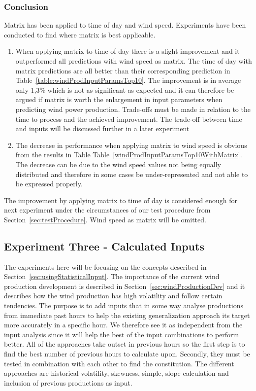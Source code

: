 \subsubsection{Conclusion}
Matrix has been applied to time of day and wind speed. Experiments have been conducted to find where matrix is best applicable.

\begin{enumerate}
\item When applying matrix to time of day there is a slight improvement and it outperformed all predictions with wind speed as matrix. The time of day with matrix predictions are all better than their corresponding prediction in Table~\ref{table:windProdInputParamsTop10}. The improvement is in average only 1,3\% which is not as significant as expected and it can therefore be argued if matrix is worth the enlargement in input parameters when predicting wind power production. Trade-offs must be made in relation to the time to process and the achieved improvement. The trade-off between time and inputs will be discussed further in a later experiment 
\item The decrease in performance when applying matrix to wind speed is obvious from the results in Table Table~\ref{windProdInputParamsTop10WithMatrix}. The decrease can be due to the wind speed values not being equally distributed and therefore in some cases be under-represented and not able to be expressed properly.  
\end{enumerate}

The improvement by applying matrix to time of day is considered enough for next experiment under the circumstances of our test procedure from Section~\ref{sec:testProcedure}. Wind speed as matrix will be omitted.

\newpage

\subsection{Experiment Three - Calculated Inputs}
The experiments here will be focusing on the concepts described in Section~\ref{sec:usingStatisticalInput}. The importance of the current wind production development is described in Section~\ref{sec:windProductionDev} and it describes how the wind production has high volatility and follow certain tendencies. The purpose is to add inputs that in some way analyse productions from immediate past hours to help the existing generalization approach its target more accurately in a specific hour. We therefore see it as independent from the input analysis since it will help the best of the input combinations to perform better. All of the approaches take outset in previous hours so the first step is to find the best number of previous hours to calculate upon. Secondly, they must be tested in combination with each other to find the constitution. The different approaches are historical volatility, skewness, simple, slope calculation and inclusion of previous productions as input. 

